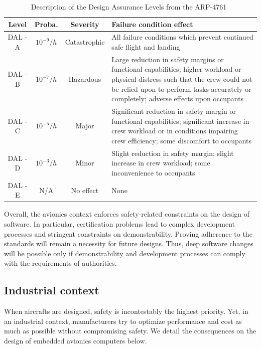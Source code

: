 \documentclass[main.tex]{subfiles}
\begin{document}
\begin{table}
    \centering  
    {
    \small
    \begin{tabularx}{\textwidth}{cccX}
	\hline
        {\sc \textbf{Level}} 	& {\sc \textbf{Proba.}} & {\sc \textbf{Severity}} & {\sc \textbf{Failure condition effect}}	\\
	    \hline
        DAL - A & $10^{-9}/h$ & Catastrophic & All failure conditions which prevent continued safe flight and landing \\
        
        \hline
        DAL - B & $10^{-7}/h$ & Hazardous    & Large reduction in safety margins or functional capabilities; higher workload or physical distress such that the crew could not be relied upon to perform tasks accurately or completely; adverse effects upon occupants\\

        \hline
        DAL - C & $10^{-5}/h$ & Major        & Significant reduction in safety margin or functional capabilities; significant increase in crew workload or in conditions impairing crew efficiency; some discomfort to occupants\\

        \hline
        DAL - D & $10^{-3}/h$ & Minor        & Slight reduction in safety margin; slight increase in crew workload; some inconvenience to occupants \\

        \hline
        DAL - E &   N/A       & No effect    & None \\
        \hline	
\end{tabularx}
    }
    \caption{Description of the Design Assurance Levels from the ARP-4761~\cite{arp4761}}
    \label{tab_intro_DALs}
\end{table}


Overall, the avionics context enforces safety-related constraints on the design of software. In particular, certification problems lead to complex development processes and stringent constraints on demonstrability. Proving adherence to the standards will remain a necessity for future designs. Thus, deep software changes will be possible only if demonstrability and development processes can comply with the requirements of authorities.


\subsection{Industrial context}
When aircrafts are designed, safety is incontestably the highest priority. Yet, in an industrial context, manufacturers try to optimize performance and cost as much as possible without compromising safety. We detail the consequences on the design of embedded avionics computers below.
\end{document}
